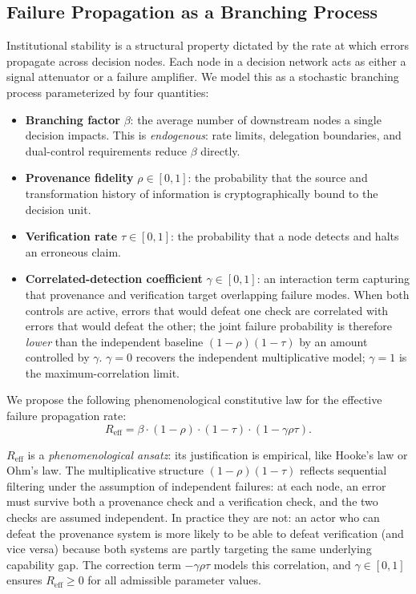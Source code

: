\documentclass[runningheads]{llncs}
\begin{document}
\subsection{Failure Propagation as a Branching Process}

Institutional stability is a structural property dictated by the rate at which errors propagate across decision nodes. Each node in a decision network acts as either a signal attenuator or a failure amplifier. We model this as a stochastic branching process parameterized by four quantities:

\begin{itemize}
\item \textbf{Branching factor} $\beta$: the average number of downstream nodes a single decision impacts. This is \emph{endogenous}: rate limits, delegation boundaries, and dual-control requirements reduce $\beta$ directly.
\item \textbf{Provenance fidelity} $\rho \in [0,1]$: the probability that the source and transformation history of information is cryptographically bound to the decision unit.
\item \textbf{Verification rate} $\tau \in [0,1]$: the probability that a node detects and halts an erroneous claim.
\item \textbf{Correlated-detection coefficient} $\gamma \in [0,1]$: an interaction term capturing that provenance and verification target overlapping failure modes. When both controls are active, errors that would defeat one check are correlated with errors that would defeat the other; the joint failure probability is therefore \emph{lower} than the independent baseline $(1-\rho)(1-\tau)$ by an amount controlled by $\gamma$. $\gamma = 0$ recovers the independent multiplicative model; $\gamma = 1$ is the maximum-correlation limit.
\end{itemize}

We propose the following phenomenological constitutive law for the effective failure propagation rate:
\begin{equation}
R_{\mathrm{eff}} = \beta \cdot (1-\rho) \cdot (1-\tau) \cdot (1-\gamma \rho \tau).
\label{eq:reff}
\end{equation}

$R_{\mathrm{eff}}$ is a \emph{phenomenological ansatz}: its justification is empirical, like Hooke's law or Ohm's law. The multiplicative structure $(1-\rho)(1-\tau)$ reflects sequential filtering under the assumption of independent failures: at each node, an error must survive both a provenance check and a verification check, and the two checks are assumed independent. In practice they are not: an actor who can defeat the provenance system is more likely to be able to defeat verification (and vice versa) because both systems are partly targeting the same underlying capability gap. The correction term $-\gamma\rho\tau$ models this correlation, and $\gamma \in [0,1]$ ensures $R_{\mathrm{eff}} \geq 0$ for all admissible parameter values.
\end{document}

